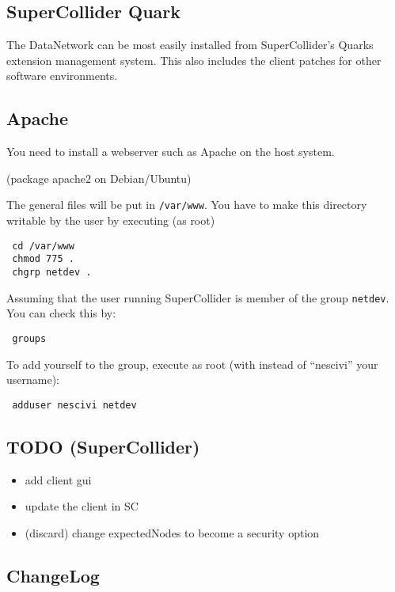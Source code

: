 \documentclass[letterpaper,10pt]{article}
\begin{document}
\subsection{SuperCollider Quark}

The DataNetwork can be most easily installed from SuperCollider's Quarks extension management system.
This also includes the client patches for other software environments.

\subsection{Apache}

You need to install a webserver such as Apache on the host system.

(package apache2 on Debian/Ubuntu)

The general files will be put in \verb|/var/www|.
You have to make this directory writable by the user by executing (as root)

\begin{verbatim}
 cd /var/www
 chmod 775 .
 chgrp netdev .
\end{verbatim}

Assuming that the user running SuperCollider is member of the group \verb|netdev|. You can check this by:

\begin{verbatim}
 groups
\end{verbatim}

To add yourself to the group, execute as root (with instead of ``nescivi'' your username):
\begin{verbatim}
 adduser nescivi netdev
\end{verbatim}

\subsection*{TODO (SuperCollider)}
\begin{itemize}
 \item add client gui
 \item update the client in SC
 \item (discard) change expectedNodes to become a security option
\end{itemize}

\subsection*{ChangeLog}
\end{document}

